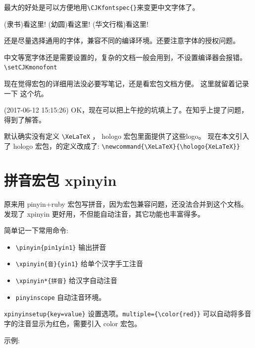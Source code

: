 \documentclass[a4paper,11pt]{article}
\begin{document}
\XeLaTeX 最大的好处是可以方便地用\verb+\CJKfontspec{}+来变更中文字体了。

{(隶书)看这里!}
{(幼圆)看这里!}
{(华文行楷)看这里!}

还是尽量选择通用的字体，兼容不同的编译环境。还要注意字体的授权问题。

中文等宽字体还是需要设置的，复杂的文档一般会用到，不设置编译器会报错。
\verb+\setCJKmonofont+

现在觉得宏包的详细用法没必要写笔记，还是看宏包文档方便。
这里就留着记录一下 \XeLaTeX 这个坑。

(2017-06-12 15:15:26)
OK，现在可以把上午挖的坑填上了。在知乎上提了问题，得到了解答。

默认确实没有定义 \verb+\XeLaTeX+ ， hologo 宏包里面提供了这些logo。
现在本文引入了 hologo 宏包，\XeLaTeX 的定义改成了:
\verb+\newcommand{\XeLaTeX}{\hologo{XeLaTeX}}+

\section{拼音宏包 xpinyin}
原来用 pinyin+ruby 宏包写拼音，因为宏包兼容问题，还没法合并到这个文档。
发现了 xpinyin 更好用，不但能自动注音，其它功能也丰富得多。

简单记一下常用命令:
\begin{itemize}
	\item \verb+\pinyin{pin1yin1}+ 输出拼音
	\item \verb+\xpinyin{音}{yin1}+ 给单个汉字手工注音
	\item \verb+\xpinyin*{拼音}+ 给汉字自动注音
	\item \verb+pinyinscope+ 自动注音环境。
\end{itemize}

\verb+xpinyinsetup{key=value}+ 设置选项。\verb+multiple={\color{red}}+
可以自动将多音字的注音显示为红色，需要引入 color 宏包。

\vspace{3mm}
示例: {\LARGE{}}
\end{document}
